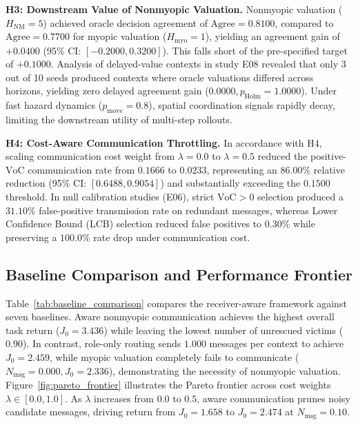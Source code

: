 \textbf{H3: Downstream Value of Nonmyopic Valuation.} Nonmyopic valuation ($H_{\mathrm{NM}}=5$) achieved oracle decision agreement of $\mathrm{Agree} = 0.8100$, compared to $\mathrm{Agree} = 0.7700$ for myopic valuation ($H_{\mathrm{myo}}=1$), yielding an agreement gain of $+0.0400$ (95\% CI: $[-0.2000, 0.3200]$). This falls short of the pre-specified target of $+0.1000$. Analysis of delayed-value contexts in study E08 revealed that only 3 out of 10 seeds produced contexts where oracle valuations differed across horizons, yielding zero delayed agreement gain ($0.0000, p_{\mathrm{Holm}} = 1.0000$). Under fast hazard dynamics ($p_{\mathrm{move}}=0.8$), spatial coordination signals rapidly decay, limiting the downstream utility of multi-step rollouts.

\textbf{H4: Cost-Aware Communication Throttling.} In accordance with H4, scaling communication cost weight from $\lambda=0.0$ to $\lambda=0.5$ reduced the positive-$\mathrm{VoC}$ communication rate from $0.1666$ to $0.0233$, representing an $86.00\%$ relative reduction (95\% CI: $[0.6488, 0.9054]$) and substantially exceeding the $0.1500$ threshold. In null calibration studies (E06), strict $\mathrm{VoC} > 0$ selection produced a $31.10\%$ false-positive transmission rate on redundant messages, whereas Lower Confidence Bound (LCB) selection reduced false positives to $0.30\%$ while preserving a $100.0\%$ rate drop under communication cost.

\subsection{Baseline Comparison and Performance Frontier}
Table~\ref{tab:baseline_comparison} compares the receiver-aware framework against seven baselines. Aware nonmyopic communication achieves the highest overall task return ($J_0 = 3.436$) while leaving the lowest number of unrescued victims ($0.90$). In contrast, role-only routing sends $1.000$ messages per context to achieve $J_0 = 2.459$, while myopic valuation completely fails to communicate ($N_{\mathrm{msg}} = 0.000, J_0 = 2.336$), demonstrating the necessity of nonmyopic valuation. Figure~\ref{fig:pareto_frontier} illustrates the Pareto frontier across cost weights $\lambda \in [0.0, 1.0]$. As $\lambda$ increases from $0.0$ to $0.5$, aware communication prunes noisy candidate messages, driving return from $J_0 = 1.658$ to $J_0 = 2.474$ at $N_{\mathrm{msg}} = 0.10$.

